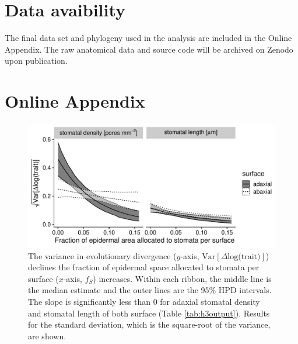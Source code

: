 \documentclass[
  12pt,
]{article}
\begin{document}
\hypertarget{data-avaibility}{%
\section{Data avaibility}\label{data-avaibility}}

The final data set and phylogeny used in the analysis are included in the Online Appendix. The raw anatomical data and source code will be archived on Zenodo upon publication.

\clearpage

\hypertarget{online-appendix}{%
\section{Online Appendix}\label{online-appendix}}

\renewcommand\thefigure{A\arabic{figure}}    
\renewcommand\thetable{A\arabic{table}}    
\renewcommand\theequation{A\arabic{equation}}    
\setcounter{figure}{0}    
\setcounter{table}{0}    
\setcounter{equation}{0}

\begin{figure}[ht]
\includegraphics[width=\textwidth]{../figures/fs-sigma.pdf}
\caption{The variance in evolutionary divergence ($y$-axis, $\textrm{Var}[\Delta \textrm{log(trait)}]$) declines the fraction of epidermal space allocated to stomata per surface ($x$-axis, $f_S$) increases. Within each ribbon, the middle line is the median estimate and the outer lines are the 95\% HPD intervals. The slope is significantly less than 0 for adaxial stomatal density and stomatal length of both surface (Table \ref{tab:h3output}). Results for the standard deviation, which is the square-root of the variance, are shown.}
\label{fig:fs-sigma}
\end{figure}
\end{document}
